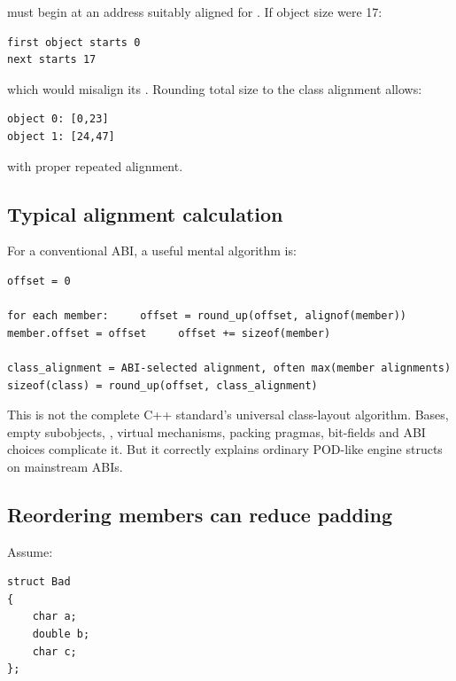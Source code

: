 must begin at an address suitably aligned for . If object size were 17:

\begin{verbatim}
first object starts 0
next starts 17
\end{verbatim}

which would misalign its . Rounding total size to the class alignment allows:

\begin{verbatim}
object 0: [0,23]
object 1: [24,47]
\end{verbatim}

with proper repeated alignment.

\subsection{Typical alignment calculation}\label{01-foundations-i-ch003-typical-alignment-calculation}

\hypertarget{01-foundations-i-ch003-typical-alignment-calculation}{}

For a conventional ABI, a useful mental algorithm is:

\begin{verbatim}
offset = 0

for each member:     offset = round_up(offset, alignof(member))     member.offset = offset     offset += sizeof(member)

class_alignment = ABI-selected alignment, often max(member alignments)
sizeof(class) = round_up(offset, class_alignment)
\end{verbatim}

This is not the complete C++ standard's universal class-layout algorithm. Bases, empty subobjects, , virtual mechanisms, packing pragmas, bit-fields and ABI choices complicate it. But it correctly explains ordinary POD-like engine structs on mainstream ABIs.

\subsection{Reordering members can reduce padding}\label{01-foundations-i-ch003-reordering-members-can-reduce-padding}

\hypertarget{01-foundations-i-ch003-reordering-members-can-reduce-padding}{}

Assume:

\begin{verbatim}
struct Bad
{
    char a;
    double b;
    char c;
};
\end{verbatim}

